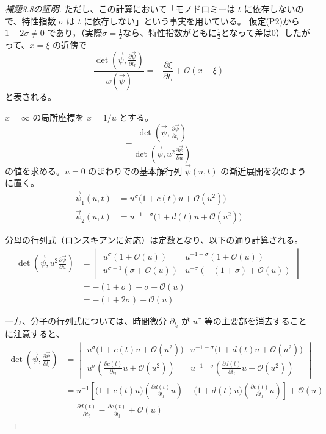 \begin{story}
\begin{proof}[補題3.8の証明]
ただし、この計算において「モノドロミーは $t$ に依存しないので、特性指数 $\sigma$ は $t$ に依存しない」という事実を用いている。
仮定(P2)から $1-2\sigma \neq 0$ であり，（実際$\sigma=\frac{1}{2}$なら、特性指数がともに$\frac{1}{2}$となって差は0）したがって、$x=\xi$ の近傍で
\begin{equation*}
    \frac{\det \left( \vec{\psi}, \frac{\partial\vec{\psi}}{\partial t_l}\right)}{w(\vec{\psi})}=-\frac{\partial \xi}{\partial t_l} + \mathcal{O}(x-\xi)
\end{equation*}
と表される。

$x=\infty$ の局所座標を $x = 1/u$ とする。
\begin{equation}
    - \frac{\det\left(\vec{\psi}, \frac{\partial \vec{\psi}}{\partial t_l}\right)}{\det\left(\vec{\psi}, u^2 \frac{\partial \vec{\psi}}{\partial u}\right)} \label{eq:a2_inf_2}
\end{equation}
の値を求める。$u=0$ のまわりでの基本解行列 $\vec{\psi}(u,t)$ の漸近展開を次のように置く。
\begin{align*}
    \vec{\psi}_1(u,t) &= u^\sigma \big(1 + c(t)u + \mathcal{O}(u^2)\big) \\
    \vec{\psi}_2(u,t) &= u^{-1-\sigma} \big(1 + d(t)u + \mathcal{O}(u^2)\big)
\end{align*}

分母の行列式（ロンスキアンに対応）は定数となり、以下の通り計算される。
\begin{align*}
    \det\left(\vec{\psi}, u^2 \frac{\partial \vec{\psi}}{\partial u}\right) &= 
    \begin{vmatrix}
        u^\sigma (1 + \mathcal{O}(u)) & u^{-1-\sigma} (1 + \mathcal{O}(u)) \\[6pt]
        u^{\sigma+1} (\sigma + \mathcal{O}(u)) & u^{-\sigma} (-(1+\sigma) + \mathcal{O}(u))
    \end{vmatrix} \\[8pt]
    &= -(1+\sigma) - \sigma + \mathcal{O}(u) \\
    &= -(1+2\sigma) + \mathcal{O}(u)
\end{align*}

一方、分子の行列式については、時間微分 $\partial_{t_l}$ が $u^\sigma$ 等の主要部を消去することに注意すると、
\begin{align*}
    \det\left(\vec{\psi}, \frac{\partial \vec{\psi}}{\partial t_l}\right) &= 
    \begin{vmatrix}
        u^\sigma \big(1 + c(t)u + \mathcal{O}(u^2)\big) & u^{-1-\sigma} \big(1 + d(t)u + \mathcal{O}(u^2)\big) \\[6pt]
        u^\sigma \left(\frac{\partial c(t)}{\partial t_l}u + \mathcal{O}(u^2)\right) & u^{-1-\sigma} \left(\frac{\partial d(t)}{\partial t_l}u + \mathcal{O}(u^2)\right)
    \end{vmatrix} \\[8pt]
    &= u^{-1} \left[ \big(1 + c(t)u\big)\left(\frac{\partial d(t)}{\partial t_l}u\right) - \big(1 + d(t)u\big)\left(\frac{\partial c(t)}{\partial t_l}u\right) \right] + \mathcal{O}(u) \\[4pt]
    &= \frac{\partial d(t)}{\partial t_l} - \frac{\partial c(t)}{\partial t_l} + \mathcal{O}(u)
\end{align*}


\end{proof}
\end{story}
